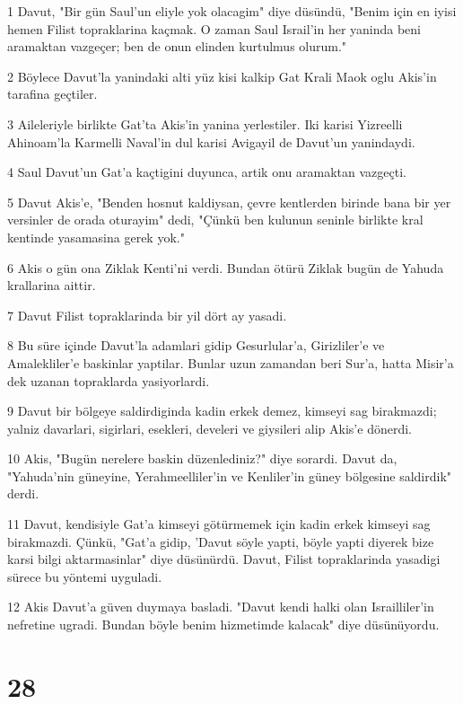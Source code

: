 \par 1 Davut, "Bir gün Saul'un eliyle yok olacagim" diye düsündü, "Benim için en iyisi hemen Filist topraklarina kaçmak. O zaman Saul Israil'in her yaninda beni aramaktan vazgeçer; ben de onun elinden kurtulmus olurum."
\par 2 Böylece Davut'la yanindaki alti yüz kisi kalkip Gat Krali Maok oglu Akis'in tarafina geçtiler.
\par 3 Aileleriyle birlikte Gat'ta Akis'in yanina yerlestiler. Iki karisi Yizreelli Ahinoam'la Karmelli Naval'in dul karisi Avigayil de Davut'un yanindaydi.
\par 4 Saul Davut'un Gat'a kaçtigini duyunca, artik onu aramaktan vazgeçti.
\par 5 Davut Akis'e, "Benden hosnut kaldiysan, çevre kentlerden birinde bana bir yer versinler de orada oturayim" dedi, "Çünkü ben kulunun seninle birlikte kral kentinde yasamasina gerek yok."
\par 6 Akis o gün ona Ziklak Kenti'ni verdi. Bundan ötürü Ziklak bugün de Yahuda krallarina aittir.
\par 7 Davut Filist topraklarinda bir yil dört ay yasadi.
\par 8 Bu süre içinde Davut'la adamlari gidip Gesurlular'a, Girizliler'e ve Amalekliler'e baskinlar yaptilar. Bunlar uzun zamandan beri Sur'a, hatta Misir'a dek uzanan topraklarda yasiyorlardi.
\par 9 Davut bir bölgeye saldirdiginda kadin erkek demez, kimseyi sag birakmazdi; yalniz davarlari, sigirlari, esekleri, develeri ve giysileri alip Akis'e dönerdi.
\par 10 Akis, "Bugün nerelere baskin düzenlediniz?" diye sorardi. Davut da, "Yahuda'nin güneyine, Yerahmeelliler'in ve Kenliler'in güney bölgesine saldirdik" derdi.
\par 11 Davut, kendisiyle Gat'a kimseyi götürmemek için kadin erkek kimseyi sag birakmazdi. Çünkü, "Gat'a gidip, 'Davut söyle yapti, böyle yapti diyerek bize karsi bilgi aktarmasinlar" diye düsünürdü. Davut, Filist topraklarinda yasadigi sürece bu yöntemi uyguladi.
\par 12 Akis Davut'a güven duymaya basladi. "Davut kendi halki olan Israilliler'in nefretine ugradi. Bundan böyle benim hizmetimde kalacak" diye düsünüyordu.

\chapter{28}

